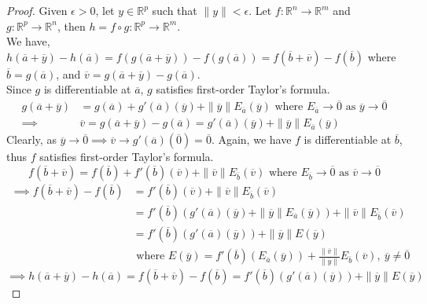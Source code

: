 \begin{proof}
	Given $\epsilon > 0$, let $y \in \mathbb{R}^p$ such that $\|y\| < \epsilon$. Let $f : \mathbb{R}^n \to \mathbb{R}^m$ and $g : \mathbb{R}^p \to \mathbb{R}^n$, then $h = f \circ g : \mathbb{R}^p \to \mathbb{R}^m$.\\

	We have, $h(\overline{a}+\overline{y})-h(\overline{a}) = f(g(\overline{a}+\overline{y})) - f(g(\overline{a})) = f(\overline{b}+\overline{v}) - f(\overline{b})$ where $\overline{b} = g(\overline{a})$, and  $\overline{v} = g(\overline{a}+\overline{y})-g(\overline{a})$.\\

	Since $g$ is differentiable at $\overline{a}$, $g$ satisfies first-order Taylor's formula.
	\begin{align*}
		g(\overline{a}+\overline{y}) & =  g(\overline{a}) + g'(\overline{a})(\overline{y}) + \|\overline{y}\| E_{\overline{a}}(\overline{y}) \text{ where } E_{\overline{a}} \to \overline{0} \text{ as } \overline{y} \to \overline{0} \\
		\implies & \overline{v} = g(\overline{a}+\overline{y})-g(\overline{a}) = g'(\overline{a})(\overline{y}) + \|\overline{y}\| E_{\overline{a}}(\overline{y})
	\end{align*}
	Clearly, as $\overline{y} \to \overline{0} \implies \overline{v} \to g'(\overline{a})(\overline{0}) = \overline{0}$. Again,  we have $f$ is differentiable at $\overline{b}$, thus $f$ satisfies first-order Taylor's formula.
	\[ f(\overline{b}+\overline{v}) = f(\overline{b}) + f'(\overline{b})(\overline{v}) + \|\overline{v}\| E_{\overline{b}}(\overline{v}) \text{ where } E_{\overline{b}} \to \overline{0} \text{ as } \overline{v} \to \overline{0} \]
	\begin{align*}
		\implies f(\overline{b}+\overline{v}) - f(\overline{b}) & = f'(\overline{b})(\overline{v}) + \|\overline{v}\| E_{\overline{b}}(\overline{v}) \\
		& = f'(\overline{b})\left( g'(\overline{a})(\overline{y}) + \|\overline{y}\|E_{\overline{a}}(\overline{y}) \right) + \|\overline{v}\| E_{\overline{b}}(\overline{v}) \\
		& = f'(\overline{b})(g'(\overline{a})(\overline{y})) + \|\overline{y}\| E(\overline{y}) \\
		& \text{ where } E(\overline{y}) = f'(\overline{b})(E_{\overline{a}}(\overline{y})) + \frac{\|\overline{v}\|}{\|\overline{y}\|} E_{\overline{b}}(\overline{v}),\ \overline{y} \ne \overline{0}
	\end{align*}
	\[ \implies h(\overline{a}+\overline{y})-h(\overline{a}) = f(\overline{b}+\overline{v}) - f(\overline{b}) = f'(\overline{b})(g'(\overline{a})(\overline{y})) + \|\overline{y}\|E(\overline{y}) \]


\end{proof}
